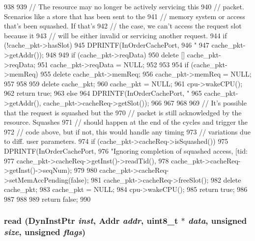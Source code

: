 \begin{DoxyCode}
938 {
939     // The resource may no longer be actively servicing this
940     // packet. Scenarios like a store that has been sent to the
941     // memory system or access that's been squashed. If that's
942     // the case, we can't access the request slot because it
943     // will be either invalid or servicing another request.
944     if (!cache_pkt->hasSlot) {
945         DPRINTF(InOrderCachePort,
946                 "%
947                 cache_pkt->getAddr());
948 
949         if (cache_pkt->reqData) {
950             delete [] cache_pkt->reqData;
951             cache_pkt->reqData = NULL;
952         }
953 
954         if (cache_pkt->memReq) {
955             delete cache_pkt->memReq;
956             cache_pkt->memReq = NULL;
957         }
958 
959         delete cache_pkt;
960         cache_pkt = NULL;
961         cpu->wakeCPU();
962         return true;
963     } else {
964         DPRINTF(InOrderCachePort, "%
965                 cache_pkt->getAddr(), cache_pkt->cacheReq->getSlot());
966     }
967 
968 
969     // It's possible that the request is squashed but the
970     // packet is still acknowledged by the resource. Squashes
971     // should happen at the end of the cycles and trigger the
972     // code above, but if not, this would handle any timing
973     // variations due to diff. user parameters.
974     if (cache_pkt->cacheReq->isSquashed()) {
975         DPRINTF(InOrderCachePort,
976                 "Ignoring completion of squashed access, [tid:%
977                 cache_pkt->cacheReq->getInst()->readTid(),
978                 cache_pkt->cacheReq->getInst()->seqNum);
979 
980         cache_pkt->cacheReq->setMemAccPending(false);
981         cache_pkt->cacheReq->freeSlot();
982         delete cache_pkt;
983         cache_pkt = NULL;
984         cpu->wakeCPU();
985         return true;
986     }
987 
988 
989     return false;
990 }
\end{DoxyCode}
\hypertarget{classCacheUnit_ac48fe45ef23fddfa02b5136cda4c060e}{
\subsubsection[{read}]{ read ({\bf DynInstPtr} {\em inst}, \/  {\bf Addr} {\em addr}, \/  uint8\_\-t $\ast$ {\em data}, \/  unsigned {\em size}, \/  unsigned {\em flags})}}
\label{classCacheUnit_ac48fe45ef23fddfa02b5136cda4c060e}



